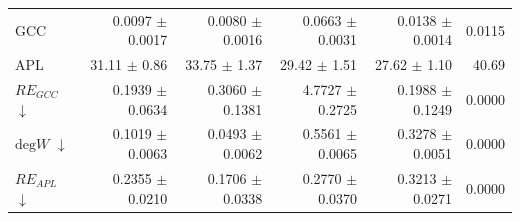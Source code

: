 \begin{table}[H]
\begin{tabular}{lrrrrr}
GCC                           & 0.0097 $\pm$ 0.0017 & 0.0080 $\pm$ 0.0016 & 0.0663 $\pm$ 0.0031 & 0.0138 $\pm$ 0.0014 & 0.0115 \\
APL                           & 31.11 $\pm$ 0.86 & 33.75 $\pm$ 1.37 & 29.42 $\pm$ 1.51 & 27.62 $\pm$ 1.10 & 40.69 \\
\midrule
$RE_{GCC}$ $\downarrow$       & 0.1939 $\pm$ 0.0634 & 0.3060 $\pm$ 0.1381 & 4.7727 $\pm$ 0.2725 & 0.1988 $\pm$ 0.1249 & 0.0000 \\
$\mathrm{deg}W$ $\downarrow$  & 0.1019 $\pm$ 0.0063 & 0.0493 $\pm$ 0.0062 & 0.5561 $\pm$ 0.0065 & 0.3278 $\pm$ 0.0051 & 0.0000 \\
$RE_{APL}$ $\downarrow$       & 0.2355 $\pm$ 0.0210 & 0.1706 $\pm$ 0.0338 & 0.2770 $\pm$ 0.0370 & 0.3213 $\pm$ 0.0271 & 0.0000 \\
\bottomrule
\end{tabular}
\end{table}

